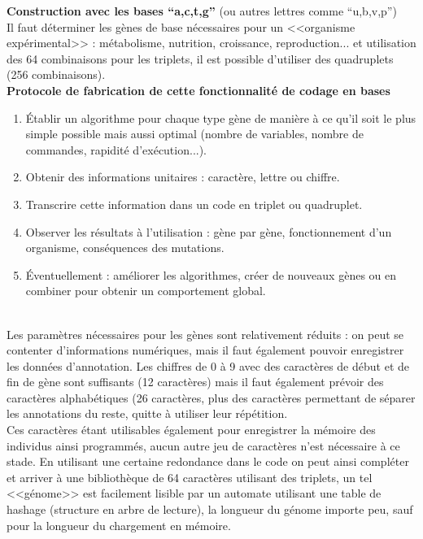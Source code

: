 \documentclass[11pt,twoside,a4paper]{article}
\begin{document}

\textbf{Construction avec les bases ``a,c,t,g''} (ou autres lettres comme ``u,b,v,p'')~\\
Il faut d{\'e}terminer les g{\`e}nes de base n{\'e}cessaires pour un <<organisme exp{\'e}rimental>> : m{\'e}tabolisme, nutrition, croissance, reproduction... et utilisation des 64 combinaisons pour les triplets, il est possible d'utiliser des quadruplets (256 combinaisons).~\\

\textbf{Protocole de fabrication de cette fonctionnalit{\'e} de codage en bases}
\begin{enumerate}
	\item {\'E}tablir un algorithme pour chaque type g{\`e}ne de mani{\`e}re {\`a} ce qu'il soit le plus simple possible mais aussi optimal (nombre de variables, nombre de commandes, rapidit{\'e} d'ex{\'e}cution...). 
	\item Obtenir des informations unitaires : caract{\`e}re, lettre ou chiffre. 
	\item Transcrire cette information dans un code en triplet ou quadruplet. 
	\item Observer les r{\'e}sultats {\`a} l'utilisation : g{\`e}ne par g{\`e}ne, fonctionnement d'un organisme, cons{\'e}quences des mutations. %
	\item {\'E}ventuellement : am{\'e}liorer les algorithmes, cr{\'e}er de nouveaux g{\`e}nes ou en combiner pour obtenir un comportement global. 
\end{enumerate}~\\

Les param{\`e}tres n{\'e}cessaires pour les g{\`e}nes sont relativement r{\'e}duits : on peut se contenter d'informations num{\'e}riques, mais il faut {\'e}galement pouvoir enregistrer les donn{\'e}es d'annotation. Les chiffres de 0 {\`a} 9 avec des caract{\`e}res de d{\'e}but et de fin de g{\`e}ne sont suffisants (12 caract{\`e}res) mais il faut {\'e}galement pr{\'e}voir des caract{\`e}res alphab{\'e}tiques (26 caract{\`e}res, plus des caract{\`e}res permettant de s{\'e}parer les annotations du reste, quitte {\`a} utiliser leur r{\'e}p{\'e}tition.~\\

Ces caract{\`e}res {\'e}tant utilisables {\'e}galement pour enregistrer la m{\'e}moire des individus ainsi programm{\'e}s, aucun autre jeu de caract{\`e}res n'est n{\'e}cessaire {\`a} ce stade. En utilisant une certaine redondance dans le code on peut ainsi compl{\'e}ter et arriver {\`a} une biblioth{\`e}que de 64 caract{\`e}res utilisant des triplets, un tel <<g{\'e}nome>> est facilement lisible par un automate utilisant une table de hashage (structure en arbre de lecture), la longueur du g{\'e}nome importe peu, sauf pour la longueur du chargement en m{\'e}moire.~\\
\end{document}
